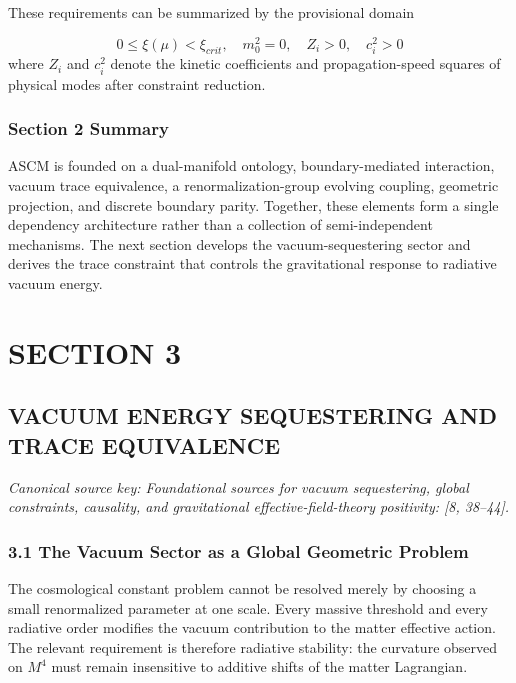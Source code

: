 \documentclass[aps,prd,onecolumn,superscriptaddress,nofootinbib,longbibliography,10pt]{revtex4-2}
\begin{document}
  These requirements can be summarized by the provisional domain


  \[ 0 \le \xi(\mu) < \xi_{crit}, \quad m_0^2 = 0, \quad Z_i > 0, \quad c_i^2 > 0 \]
  where \(Z_i\) and \(c_i^2\) denote the kinetic coefficients and propagation-speed squares of physical modes after constraint reduction.


  
\subsubsection*{Section 2 Summary}

  ASCM is founded on a dual-manifold ontology, boundary-mediated interaction, vacuum trace equivalence, a renormalization-group evolving coupling, geometric projection, and discrete boundary parity. Together, these elements form a single dependency architecture rather than a collection of semi-independent mechanisms. The next section develops the vacuum-sequestering sector and derives the trace constraint that controls the gravitational response to radiative vacuum energy.




 

  
\section*{SECTION 3}

  
\subsection*{VACUUM ENERGY SEQUESTERING AND TRACE EQUIVALENCE}

  \textit{Canonical source key: Foundational sources for vacuum sequestering, global constraints, causality, and gravitational effective-field-theory positivity: [8, 38–44].}


  
\subsubsection*{3.1 The Vacuum Sector as a Global Geometric Problem}

  The cosmological constant problem cannot be resolved merely by choosing a small renormalized parameter at one scale. Every massive threshold and every radiative order modifies the vacuum contribution to the matter effective action. The relevant requirement is therefore radiative stability: the curvature observed on \(M^4\) must remain insensitive to additive shifts of the matter Lagrangian.
\end{document}
